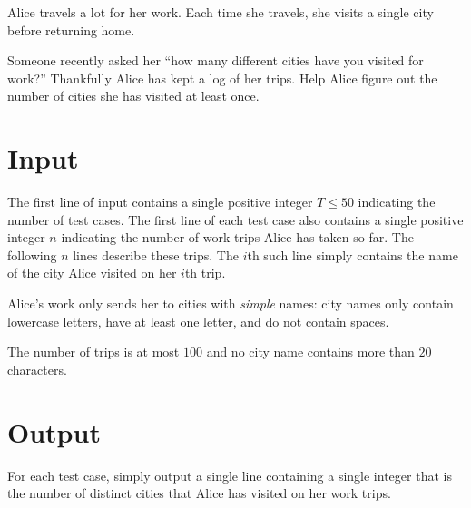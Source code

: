 
\setlength{\columnsep}{15pt}


Alice travels a lot for her work. Each time she travels, she visits a single
city before returning home.

Someone recently asked her ``how many different cities have you visited for
work?'' Thankfully Alice has kept a log of her trips. Help Alice figure
out the number of cities she has visited at least once.

\section*{Input}
The first line of input contains a single positive integer $T \leq 50$ indicating
the number of test cases. The first line of each test case also contains
a single positive integer $n$ indicating the number of work trips Alice has taken
so far. The following $n$ lines describe these trips.
The $i$th such line simply contains the name of the city Alice
visited on her $i$th trip.

Alice's work only sends her to cities with {\em simple} names:
city names only contain lowercase letters, have at least one letter,
and do not contain spaces.

The number of trips is at most $100$ and no city name contains more than $20$
characters.

\section*{Output}
For each test case, simply output a single line containing a single
integer that is the number of distinct cities that Alice has visited
on her work trips.
